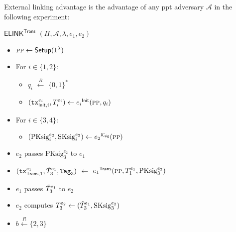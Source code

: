             \begin{definition}
            \label{def:External Linking Advantage}
            External linking advantage is the advantage of any \gls{ppt} adversary $\mathcal{A}$ in the following experiment:

            $\mathsf{ELINK}^\textsf{Trans}$  $(\Pi, \mathcal{A}, \lambda, e_1, e_2)$%
        \begin{itemize}
                \item [] $\textsc{pp} \leftarrow \textsf{Setup}(1^\lambda)$ 

                
                \item []  For $ i \in \{1, 2\}$:
                \begin{itemize}
                    \item [] $q_i$ $\xleftarrow{R}$ $\{0, 1\}^*$ 
                    \item [] $(\texttt{tx}_{\mathsf{Init}, i}^{e_i}, T_i^{e_i}) \leftarrow {e_i}^\textsf{Init}(\textsc{pp}, q_i)$
                \end{itemize}

                \item []  For $ i \in \{3, 4\}$:
                \begin{itemize}
                    \item[] $(\text{PKsig}^{e_2}_i, \text{SKsig}^{e_2}_i) \leftarrow {e_2}^{\mathcal{K}_\mathsf{sig}}(\textsc{pp})$
                \end{itemize}
                \item [] $e_2$ passes $\text{PKsig}^{e_2}_3$ to $e_1$
                
                \item[] $(\texttt{tx}_{\mathsf{Trans},1}^{e_1}, \Tilde{T}^{e_1}_3, \texttt{Tag}_3)$ $\leftarrow$ ${e_1}^\mathsf{Trans}(\textsc{pp}, T_1^{e_1}, \text{PKsig}^{e_2}_3)$

                \item [] $e_1$ passes $\Tilde{T}^{e_1}_3$ to $e_2$

                \item []  $e_2$ computes $T^{e_2}_3 \leftarrow (\Tilde{T}^{e_1}_3, \text{SKsig}^{e_2}_3)$
                
                \item[] $b \xleftarrow{R} \{2, 3\}$


\end{itemize}
\end{definition}
